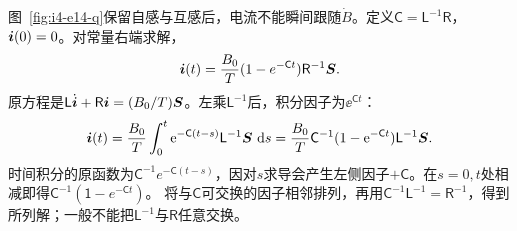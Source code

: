 \begin{solution}
图~\ref{fig:i4-e14-q}保留自感与互感后，电流不能瞬间跟随$\dot B$。定义$\mathsf C=\mathsf L^{-1}\mathsf R$，$\bm{i}(0)=0$。对常量右端求解，
\[
\bm{i}(t)=\frac{B_0}{T}
(1-e^{-\mathsf Ct})\mathsf R^{-1}\bm{S}.
\]
原方程是$\mathsf L\dot{\bm{i}}+\mathsf R\bm{i}=(B_0/T)\bm{S}$。左乘$\mathsf L^{-1}$后，积分因子为$\ee^{\mathsf Ct}$：
\[
\bm{i}(t)=\frac{B_0}{T}\int_0^t
\mathrm e^{-\mathsf C(t-s)}\mathsf L^{-1}\bm{S}\,\mathop{}\!\mathrm d s
=\frac{B_0}{T}\mathsf C^{-1}(1-\mathrm e^{-\mathsf Ct})
\mathsf L^{-1}\bm{S}.
\]
时间积分的原函数为$\mathsf C^{-1}e^{-\mathsf C(t-s)}$，因对$s$求导会产生左侧因子$+\mathsf C$。在$s=0,t$处相减即得$\mathsf C^{-1}(\mathsf 1-e^{-\mathsf Ct})$。
将与$\mathsf C$可交换的因子相邻排列，再用$\mathsf C^{-1}\mathsf L^{-1}=\mathsf R^{-1}$，得到所列解；一般不能把$\mathsf L^{-1}$与$\mathsf R$任意交换。


\end{solution}
